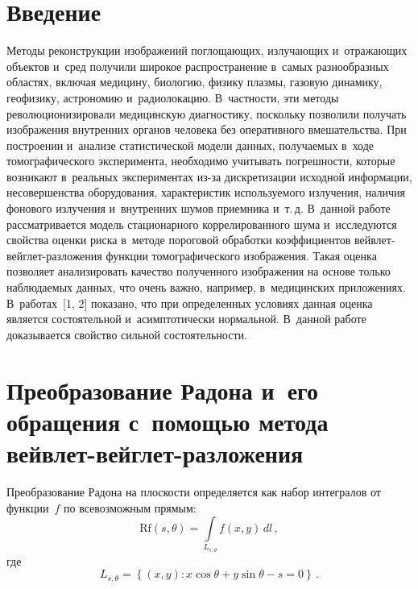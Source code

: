 
  



\thispagestyle{headings}

\begin{multicols}{2}

\label{st\stat}
  

\section{Введение}

Методы реконструкции изображений поглощающих, излучающих и~отражающих объектов и~сред 
получили широкое распространение в~самых разнообразных областях, включая медицину, 
биологию, физику плазмы, газовую динамику, геофизику, астрономию и~радиолокацию. 
В~частности, эти методы революционизировали медицинскую диагностику, поскольку позволили 
получать изоб\-ра\-же\-ния внутренних органов человека без оперативного вмешательства. 
При построении и~анализе статистической модели данных, получаемых в~ходе 
томографического эксперимента, необходимо учитывать погрешности, которые 
возникают в~реальных экспериментах из-за дискретизации исходной информации, 
несовершенства оборудования, характеристик используемого излучения, наличия 
фонового излучения и~внутренних шумов приемника и~т.\,д. В~данной работе рассматривается 
модель стационарного коррелированного шума и~исследуются свойства оценки риска в~методе 
пороговой обработки коэффициентов вей\-в\-лет-вейг\-лет-раз\-ло\-же\-ния функции 
томографического изоб\-ра\-же\-ния. Такая оценка позволяет анализировать качество 
полученного изоб\-ра\-же\-ния на основе только наблюдаемых данных, что очень важно, 
например, в~медицинских приложениях. В~работах~[1, 2] показано, что при 
определенных условиях данная оценка является состоятельной и~асимптотически 
нормальной. В~данной работе доказывается свойство сильной состоятельности.

\section{Преобразование Радона и~его обращения с~помощью метода 
вейвлет-вейглет-разложения}

Преобразование Радона на плоскости определяется как набор интегралов от функции~$f$ 
по всевозможным прямым:
\begin{equation*}
\mathrm{R f}\left(s,\theta\right) = \int\limits_{L_{s,\theta}} f(x,y)\, dl\,,
\end{equation*}
где
\begin{equation*}
L_{s,\theta} = \left\{(x,y)\colon x\cos\theta + y\sin\theta - s = 0 \right\}\,.
\end{equation*}


\end{multicols}
